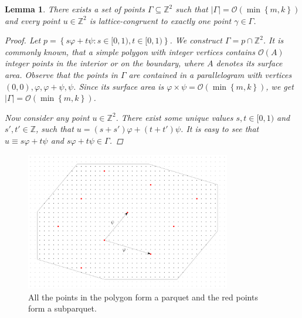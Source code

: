 \documentclass[11pt]{article}
\newcommand{\Z}{\mathbb{Z}}
\renewcommand{\O}{\mathcal{O}}
\renewcommand{\phi}{\varphi}
\newcommand{\set}[1]{\left\lbrace #1 \right\rbrace}
\theoremstyle{plain}
\newtheorem{lemma}{Lemma}
\theoremstyle{definition}
\theoremstyle{remark}
\begin{document}
\begin{lemma} \label{lattice_base}
	There exists a set of points $\Gamma \subseteq \Z^2$ such that $|\Gamma| = \O(\min\set{m, k})$ and every point $u \in \Z^2$ is lattice-congruent to exactly one point $\gamma \in \Gamma$.
	\begin{proof}
		Let $p = \set{s\phi + t\psi : s \in [0, 1), t \in [0, 1)}$.
		We construct $\Gamma = p \cap \Z^2$.
		It is commonly known, that a simple polygon with integer vertices contains $\O(A)$ integer points in the interior or on the boundary, where $A$ denotes its surface area.
		Observe that the points in $\Gamma$ are contained in a parallelogram with vertices $(0, 0), \phi, \phi + \psi, \psi$.
		Since its surface area is $\phi \times \psi = \O(\min\set{m, k})$, we get $|\Gamma| = \O(\min\set{m, k})$.
		
		Now consider any point $u \in \Z^2$.
		There exist some unique values $s, t \in [0, 1)$ and $s', t' \in \Z$, such that
		$u = (s + s') \phi + (t + t') \psi$.
		It is easy to see that
		$u \equiv s\phi + t\psi$ and $s\phi + t\psi \in \Gamma$.
	\end{proof}
\end{lemma}


\begin{figure}[!t]
	\begin{center}
		\includegraphics[width=0.8\textwidth]{drawings/parquet}
	\end{center}
	\caption{All the points in the polygon form a parquet and the red points form a subparquet.}
	\label{figure:parquet}
\end{figure}
\end{document}

